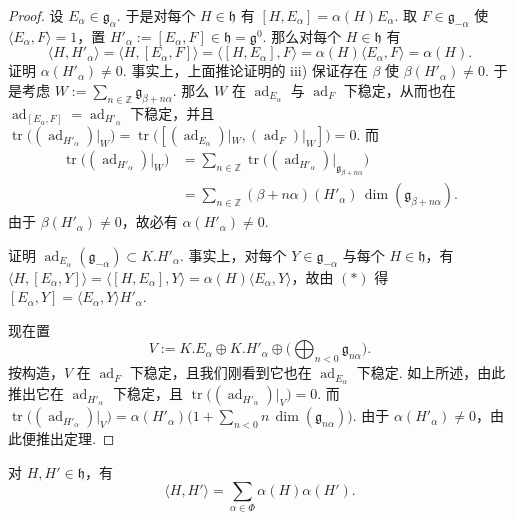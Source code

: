 \begin{proof}
设 $E_\alpha\in\mathfrak g_\alpha$. 于是对每个 $H\in\mathfrak h$ 有 $[H,E_\alpha]=\alpha(H)E_\alpha$. 取 $F\in\mathfrak g_{-\alpha}$ 使 $\langle E_\alpha,F\rangle=1$，置 $H'_\alpha:=[E_\alpha,F]\in\mathfrak h=\mathfrak g^0$. 那么对每个 $H\in\mathfrak h$ 有
\begin{equation}\tag{$(*)$}
\langle H,H'_\alpha\rangle=\langle H,[E_\alpha,F]\rangle=\langle[H,E_\alpha],F\rangle=\alpha(H)\langle E_\alpha,F\rangle=\alpha(H).
\end{equation}
证明 $\alpha(H'_\alpha)\neq 0$. 事实上，上面推论证明的 iii) 保证存在 $\beta$ 使 $\beta(H'_\alpha)\neq 0$. 于是考虑 $W:=\sum_{n\in\mathbb Z}\mathfrak g_{\beta+n\alpha}$. 那么 $W$ 在 $\operatorname{ad}_{E_\alpha}$ 与 $\operatorname{ad}_F$ 下稳定，从而也在 $\operatorname{ad}_{[E_\alpha,F]}=\operatorname{ad}_{H'_\alpha}$ 下稳定，并且 $\operatorname{tr}\big((\operatorname{ad}_{H'_\alpha})|_W\big)=\operatorname{tr}\big([(\operatorname{ad}_{E_\alpha})|_W,(\operatorname{ad}_F)|_W]\big)=0$. 而
\begin{align*}
\operatorname{tr}\big((\operatorname{ad}_{H'_\alpha})|_W\big)
&=\sum_{n\in\mathbb Z}\operatorname{tr}\big((\operatorname{ad}_{H'_\alpha})|_{\mathfrak g_{\beta+n\alpha}}\big)\\
&=\sum_{n\in\mathbb Z}(\beta+n\alpha)(H'_\alpha)\,\dim(\mathfrak g_{\beta+n\alpha}).
\end{align*}
由于 $\beta(H'_\alpha)\neq 0$，故必有 $\alpha(H'_\alpha)\neq 0$.

证明 $\operatorname{ad}_{E_\alpha}(\mathfrak g_{-\alpha})\subset K.H'_\alpha$. 事实上，对每个 $Y\in\mathfrak g_{-\alpha}$ 与每个 $H\in\mathfrak h$，有 $\langle H,[E_\alpha,Y]\rangle=\langle[H,E_\alpha],Y\rangle=\alpha(H)\langle E_\alpha,Y\rangle$，故由 $(*)$ 得 $[E_\alpha,Y]=\langle E_\alpha,Y\rangle H'_\alpha$.

现在置
\[V:=K.E_\alpha\oplus K.H'_\alpha\oplus\Big(\bigoplus_{n<0}\mathfrak g_{n\alpha}\Big).\]
按构造，$V$ 在 $\operatorname{ad}_F$ 下稳定，且我们刚看到它也在 $\operatorname{ad}_{E_\alpha}$ 下稳定. 如上所述，由此推出它在 $\operatorname{ad}_{H'_\alpha}$ 下稳定，且 $\operatorname{tr}\big((\operatorname{ad}_{H'_\alpha})|_V\big)=0$. 而 $\operatorname{tr}\big((\operatorname{ad}_{H'_\alpha})|_V\big)=\alpha(H'_\alpha)\big(1+\sum_{n<0}n\,\dim(\mathfrak g_{n\alpha})\big)$. 由于 $\alpha(H'_\alpha)\neq 0$，由此便推出定理.
\end{proof}
\begin{corollary*}
对 $H,H'\in\mathfrak h$，有
\[\langle H,H'\rangle=\sum_{\alpha\in\Phi}\alpha(H)\alpha(H').\]
\end{corollary*}
